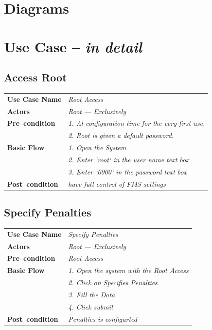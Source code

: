 \documentclass{article}
\begin{document}
\section {Diagrams}

\section{Use Case -- \textit{in detail}}
\subsection{Access Root}
    \begin{tabular}{ l | l }
    \toprule
      \rowcolor{LightCyan}
      \textbf{Use Case Name}    & \textit{Root Access}\\
      \textbf{Actors}           & \textit{Root --- Exclusively}\\
      \rowcolor{LightCyan}
      \textbf{Pre--condition}   & \textit{1. At configuration time for the very first use.} \\
      \rowcolor{LightCyan}
                                & \textit{2. Root is given a default password.}\\
      \textbf{Basic Flow}       & \textit{1. Open the System}\\
                                & \textit{2. Enter `root` in the user name text box}\\
                                & \textit{3. Enter `0000` in the password text box}\\
      \rowcolor{LightCyan}
      \textbf{Post--condition}  & \textit{have full control of FMS settings}\\
    \toprule
    \end{tabular}

\subsection{Specify Penalties}
    \begin{tabular}{ l | l }
    \toprule
      \rowcolor{LightCyan}
      \textbf{Use Case Name}    & \textit{Specify Penalties}\\
      \textbf{Actors}           & \textit{Root --- Exclusively}\\
      \rowcolor{LightCyan}
      \textbf{Pre--condition}   & \textit{Root Access}\\
      \textbf{Basic Flow}       & \textit{1. Open the system with the Root Access}\\
                                & \textit{2. Click on Specifies Penalties}\\
                                & \textit{3. Fill the Data}\\
                                & \textit{4. Click submit}\\
      \rowcolor{LightCyan}
      \textbf{Post--condition}  & \textit{Penalties is configurted}\\
    \toprule
    \end{tabular}
\end{document}
